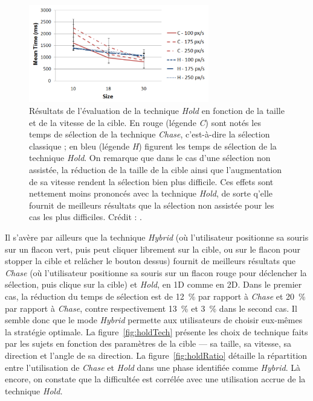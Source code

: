 \begin{appendices}
	\begin{figure}[htbp]
		\centering
		\includegraphics[width=0.70\textwidth]{figures/ch2/holdSFast}
		\caption[\emph{Hold} -- petites cibles rapides]{Résultats de l'évaluation de la technique \emph{Hold} en fonction de la taille et de la vitesse de la cible. En rouge (légende \emph{C}) sont notés les temps de sélection de la technique \emph{Chase}, c'est-à-dire la sélection classique ; en bleu (légende \emph{H}) figurent les temps de sélection de la technique \emph{Hold}. On remarque que dans le cas d'une sélection non assistée, la réduction de la taille de la cible ainsi que l'augmentation de sa vitesse rendent la sélection bien plus difficile. Ces effets sont nettement moins prononcés avec la technique \emph{Hold}, de sorte q'elle fournit de meilleurs résultats que la sélection non assistée pour les cas les plus difficiles. Crédit : \cite{hajri2011moving}.}
		\label{fig:holdSFast}
	\end{figure}
	
	Il s'avère par ailleurs que la technique \emph{Hybrid} (où l'utilisateur positionne sa souris sur un flacon vert, puis peut cliquer librement sur la cible, ou sur le flacon pour stopper la cible et relâcher le bouton dessus) fournit de meilleurs résultats que \emph{Chase} (où l'utilisateur positionne sa souris sur un flacon rouge pour déclencher la sélection, puis clique sur la cible) et \emph{Hold}, en 1D comme en 2D. Dans le premier cas, la réduction du temps de sélection est de 12~\%{} par rapport à \emph{Chase} et 20~\%{} par rapport à \emph{Chase}, contre respectivement 13~\%{} et 3~\%{} dans le second cas. Il semble donc que le mode \emph{Hybrid} permette aux utilisateurs de choisir eux-mêmes la stratégie optimale. La figure~\ref{fig:holdTech} présente les choix de technique faits par les sujets en fonction des paramètres de la cible --- sa taille, sa vitesse, sa direction et l'angle de sa direction. La figure~\ref{fig:holdRatio} détaille la répartition entre l'utilisation de \emph{Chase} et \emph{Hold} dans une phase identifiée comme \emph{Hybrid}. Là encore, on constate que la difficultée est corrélée avec une utilisation accrue de la technique \emph{Hold.}
	

\end{appendices}
